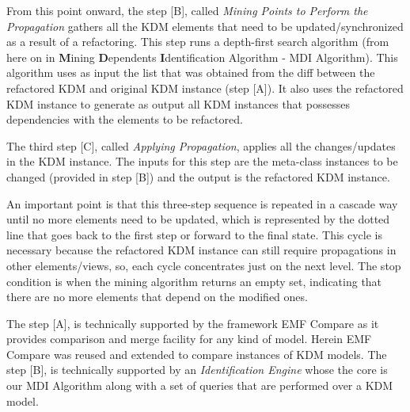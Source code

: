 From this point onward, the step [B], called \textit{Mining Points to Perform the Propagation} gathers all the KDM elements that need to be updated/synchronized as a result of a refactoring. %
This step runs a depth-first search algorithm (from here on in \textbf{M}ining \textbf{D}ependents \textbf{I}dentification Algorithm - MDI Algorithm). This algorithm uses as input the list that was obtained from the diff between the refactored KDM and original KDM instance (step [A]).
It also uses the refactored KDM instance to generate as output all KDM instances that possesses dependencies with the elements to be refactored. 

The third step [C], called \textit{Applying Propagation}, applies all the changes/updates in the KDM instance. The inputs for this step are the meta-class instances to be changed (provided in step [B]) and the output is the refactored KDM instance.

An important point is that this three-step sequence is repeated in a cascade way until no more elements need to be updated, which is represented by the dotted line that goes back to the first step or forward to the final state. This cycle is necessary because the refactored KDM instance can still require propagations in other elements/views, so, each cycle concentrates just on the next level. The stop condition is when the mining algorithm returns an empty set, indicating that there are no more elements that depend on the modified ones.

The step [A], is technically supported by the framework EMF Compare as it provides comparison and merge facility for any kind of model. Herein EMF Compare was reused and extended to compare instances of KDM models. The step [B], is technically supported by an \textit{Identification Engine} whose the core is our MDI Algorithm along with a set of queries that are performed over a KDM model. %

